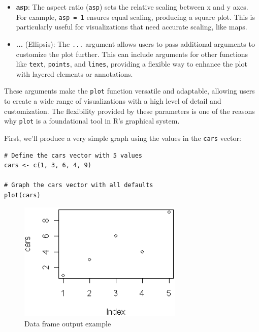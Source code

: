 \documentclass[10pt]{book}
\begin{document}
\begin{itemize}
    \item \textbf{asp}: The aspect ratio (\texttt{asp}) sets the relative scaling between x and y axes. For example, \texttt{asp = 1} ensures equal scaling, producing a square plot. This is particularly useful for visualizations that need accurate scaling, like maps.

    \item \textbf{...} (Ellipsis): The \texttt{...} argument allows users to pass additional arguments to customize the plot further. This can include arguments for other functions like \texttt{text}, \texttt{points}, and \texttt{lines}, providing a flexible way to enhance the plot with layered elements or annotations.

\end{itemize}

These arguments make the \texttt{plot} function versatile and adaptable, allowing users to create a wide range of visualizations with a high level of detail and customization. The flexibility provided by these parameters is one of the reasons why \texttt{plot} is a foundational tool in R's graphical system.



First, we'll produce a very simple graph using the values in the \texttt{cars} vector:

\begin{lstlisting}
# Define the cars vector with 5 values
cars <- c(1, 3, 6, 4, 9)

# Graph the cars vector with all defaults
plot(cars)
\end{lstlisting}

\begin{figure}[H]
    \begin{flushleft}
        \includegraphics[width=0.7\textwidth]{line_script1.png}
        \caption{Data frame output example}
        \label{fig:dataframe}
    \end{flushleft}
\end{figure}
\end{document}
